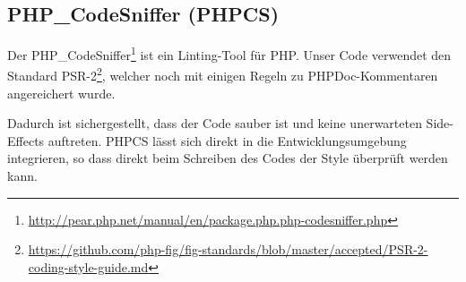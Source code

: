 \subsection{PHP\_CodeSniffer (PHPCS)}
Der PHP\_CodeSniffer\footnote{\url{http://pear.php.net/manual/en/package.php.php-codesniffer.php}} ist ein Linting-Tool für PHP.
Unser Code verwendet den Standard PSR-2\footnote{\url{https://github.com/php-fig/fig-standards/blob/master/accepted/PSR-2-coding-style-guide.md}}, welcher noch mit einigen Regeln zu PHPDoc-Kommentaren angereichert wurde.

Dadurch ist sichergestellt, dass der Code sauber ist und keine unerwarteten Side-Effects auftreten.
PHPCS lässt sich direkt in die Entwicklungsumgebung integrieren, so dass direkt beim Schreiben des Codes der Style überprüft werden kann.

